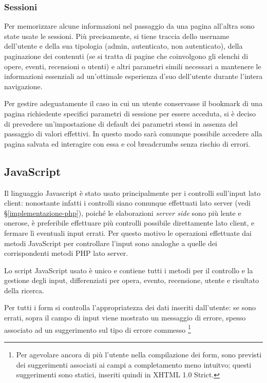 \subsubsection{Sessioni}
\label{implementazione-php-sessioni}
Per memorizzare alcune informazioni nel passaggio da una pagina all'altra sono state usate le sessioni. Più precisamente, si tiene traccia dello username dell'utente e della sua tipologia (admin, autenticato, non autenticato), della paginazione dei contenuti (se si tratta di pagine che coinvolgono gli elenchi di opere, eventi, recensioni o utenti) e altri parametri simili necessari a mantenere le informazioni essenziali ad un'ottimale esperienza d'suo dell'utente durante l'intera navigazione.

Per gestire adeguatamente il caso in cui un utente conservasse il bookmark di una pagina richiedente specifici parametri di sessione per essere acceduta, si è deciso di prevedere un'impostazione di default dei parametri stessi in assenza del passaggio di valori effettivi. In questo modo sarà comunque possibile accedere alla pagina salvata ed interagire con essa e col breadcrumbs senza rischio di errori.

\subsection{JavaScript}
\label{implementazione-javascript}
Il linguaggio Javascript è stato usato principalmente per i controlli sull'input lato client: nonostante infatti i controlli siano comunque effettuati lato server (vedi §\ref{implementazione-php}), poiché le elaborazioni \textit{server side} sono più lente e onerose, è preferibile effettuare più controlli possibile direttamente lato client, e fermare lì eventuali input errati. Per questo motivo le operazioni effettuate dai metodi JavaScript per controllare l'input sono analoghe a quelle dei corrispondenti metodi PHP lato server.

Lo script JavaScript usato è unico e contiene tutti i metodi per il controllo e la gestione degli input, differenziati per opera, evento, recensione, utente e risultato della ricerca.

Per tutti i form si controlla l'appropriatezza dei dati inseriti dall'utente: se sono errati, sopra il campo di input viene mostrato un messaggio di errore, spesso associato ad un suggerimento sul tipo di errore commesso \footnote{Per agevolare ancora di più l'utente nella compilazione dei form, sono previsti dei suggerimenti associati ai campi a completamento meno intuitvo; questi suggerimenti sono statici, inseriti quindi in XHTML 1.0 Strict.}

